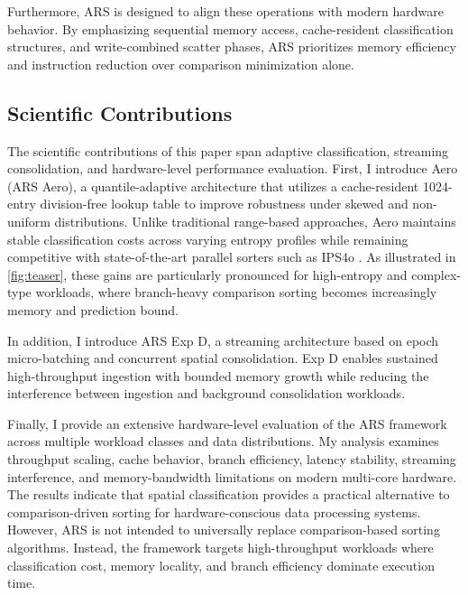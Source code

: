 Furthermore, ARS is designed to align these operations with modern hardware behavior.
By emphasizing sequential memory access, cache-resident classification structures, and write-combined scatter phases, ARS prioritizes memory efficiency and instruction reduction over comparison minimization alone.

\subsection{Scientific Contributions}
The scientific contributions of this paper span adaptive classification, streaming consolidation, and hardware-level performance evaluation.
First, I introduce Aero (ARS Aero), a quantile-adaptive architecture that utilizes a cache-resident 1024-entry division-free lookup table to improve robustness under skewed and non-uniform distributions.
Unlike traditional range-based approaches, Aero maintains stable classification costs across varying entropy profiles while remaining competitive with state-of-the-art parallel sorters such as IPS4o \cite{axtmannInPlaceParallelSuper2017}.
As illustrated in \cref{fig:teaser}, these gains are particularly pronounced for high-entropy and complex-type workloads, where branch-heavy comparison sorting becomes increasingly memory and prediction bound.

In addition, I introduce ARS Exp D, a streaming architecture based on epoch micro-batching and concurrent spatial consolidation.
Exp D enables sustained high-throughput ingestion with bounded memory growth while reducing the interference between ingestion and background consolidation workloads.

Finally, I provide an extensive hardware-level evaluation of the ARS framework across multiple workload classes and data distributions.
My analysis examines throughput scaling, cache behavior, branch efficiency, latency stability, streaming interference, and memory-bandwidth limitations on modern multi-core hardware.
The results indicate that spatial classification provides a practical alternative to comparison-driven sorting for hardware-conscious data processing systems.
However, ARS is not intended to universally replace comparison-based sorting algorithms.
Instead, the framework targets high-throughput workloads where classification cost, memory locality, and branch efficiency dominate execution time.
